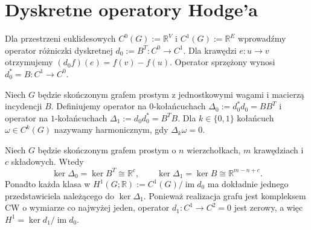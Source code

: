 \begin{center}
\end{center}

\section{Dyskretne operatory Hodge'a}
\label{sec:tg-hodge-operators}

Dla przestrzeni euklidesowych $C^0(G):=\mathbb R^V$
i $C^1(G):=\mathbb R^E$ wprowadźmy operator
różniczki dyskretnej $d_0:=B^T:C^0\to C^1$.
Dla krawędzi $e:u\to v$ otrzymujemy
$(d_0f)(e)=f(v)-f(u)$.
Operator sprzężony wynosi $d_0^*=B:C^1\to C^0$.

\begin{definicja}
Niech $G$ będzie skończonym grafem prostym z jednostkowymi
wagami i macierzą incydencji $B$. Definiujemy operator
na $0$-kołańcuchach
$\Delta_0:=d_0^*d_0=BB^T$ i operator na
$1$-kołańcuchach $\Delta_1:=d_0d_0^*=B^TB$.
Dla $k\in\{0,1\}$ kołańcuch $\omega\in C^k(G)$
nazywamy harmonicznym,
gdy $\Delta_k\omega=0$.
\end{definicja}

\begin{samepage}
\begin{twierdzenie}
\label{thm:tg-hodge-harmonic}
Niech $G$ będzie skończonym grafem prostym o $n$ wierzchołkach,
$m$ krawędziach i $c$ składowych. Wtedy
\[
\ker\Delta_0=\ker B^T\cong\mathbb R^c,
\qquad
\ker\Delta_1=\ker B\cong\mathbb R^{m-n+c}.
\]
Ponadto każda klasa w
$H^1(G;\mathbb R):=C^1(G)/\operatorname{im}d_0$
ma dokładnie jednego przedstawiciela należącego do
$\ker\Delta_1$. Ponieważ realizacja grafu jest kompleksem CW o wymiarze
co najwyżej jeden, operator $d_1:C^1\to C^2=0$ jest zerowy,
a więc $H^1=\ker d_1/\operatorname{im}d_0$.
\end{twierdzenie}
\end{samepage}

